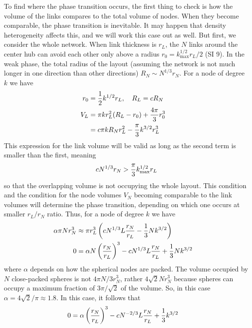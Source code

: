 \documentclass[11pt]{article}
\begin{document}
To find where the phase transition occurs, the first thing to check is how the volume of the links compares to the total volume of nodes. 
When they become comparable, the phase transition is inevitable. 
It may happen that density heterogeneity affects this, and we will work this case out as well.
But first, we consider the whole network.  
When link thickness is $r_L$, the $N$ links around the center hub can avoid each other only above a radius $r_0 = k^{1/2}_{\max} r_L /2 $ (SI 9). 
In the weak phase, the total radius of the layout (assuming the network is not much longer in one direction than other directions) $R_N \sim N^{1/3} r_N$. 
For a node of degree $k$ we have
\begin{align}
    r_0 & ={1\over 2}  k^{1/2} r_L, \quad R_L = c R_N \cr  
    V_L & = \pi k r_L^2 (R_L-r_0) + {4\pi\over 3} r_0^3 \cr 
    &= c\pi k R_N r_L^2 %
    - { \pi \over 3}k^{3/2} r_L^3  
    \label{eq:VL}
\end{align}
This expression for the link volume will be valid as long as the second term is smaller than the first, meaning
\[c N^{1/3} r_N >{\pi\over 3} k_{\max}^{1/2} r_L\]
so that the overlapping volume is not occupying the whole layout. 
This condition and the condition for the node volumes $V_N$ becoming comparable to the link volumes will determine the phase transition, depending on which one occurs at smaller $r_L/r_N$ ratio. 
Thus, for a node of degree $k$ we have
\begin{align}
    \alpha \pi N r_N^3 &\approx \pi r_L^3 \left(c N^{1/3}L  {r_N \over r_L} 
    - { 1\over 3}N {k^{3/2}}\right)\cr 
    0 &= \alpha N \left({r_N\over r_L}\right)^3 -c N^{1/3} L  {r_N \over r_L} 
    + { 1\over 3}N {k^{3/2}} 
\end{align}
where $\alpha $ depends on how the spherical nodes are packed.
The volume occupied by $N$ close-packed spheres is not $4\pi N /3 r_N^3$, rather $4\sqrt{2} N r_N^3$ because spheres can occupy a maximum fraction of $3\pi/\sqrt{2}$ of the volume. 
So, in this case $\alpha = 4\sqrt{2}/\pi \approx 1.8$. 
In this case, it follows that 
\begin{align}
    0 &= \alpha \pr{{r_N\over r_L}}^3 -c N^{-2/3} L  {r_N \over r_L} 
    + { 1\over 3} {k^{3/2}} %
    \label{eq:trans-full}
\end{align}
\end{document}
